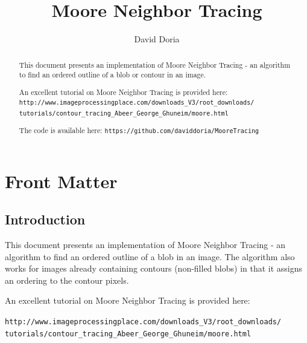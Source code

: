 \documentclass{InsightArticle}
\title{Moore Neighbor Tracing}
\author{David Doria}
\newcommand{\IJhandlerIDnumber}{3308}
\begin{document}
\IJhandlefooter{\IJhandlerIDnumber}


\ifpdf
\else
\fi


\maketitle


\ifhtml
\chapter*{Front Matter\label{front}}
\fi

\begin{abstract}
\noindent

This document presents an implementation of Moore Neighbor Tracing - an algorithm to find an ordered outline of a blob or contour in an image.

An excellent tutorial on Moore Neighbor Tracing is provided here:
\verb|http://www.imageprocessingplace.com/downloads_V3/root_downloads/|
\verb|tutorials/contour_tracing_Abeer_George_Ghuneim/moore.html|


The code is available here:
\verb|https://github.com/daviddoria/MooreTracing|

\end{abstract}

\IJhandlenote{\IJhandlerIDnumber}

\tableofcontents
\section{Introduction}
This document presents an implementation of Moore Neighbor Tracing - an algorithm to find an ordered outline of a blob in an image. The algorithm also works for images already containing contours (non-filled blobs) in that it assigns an ordering to the contour pixels.

An excellent tutorial on Moore Neighbor Tracing is provided here:

\verb|http://www.imageprocessingplace.com/downloads_V3/root_downloads/|
\verb|tutorials/contour_tracing_Abeer_George_Ghuneim/moore.html|
\end{document}
